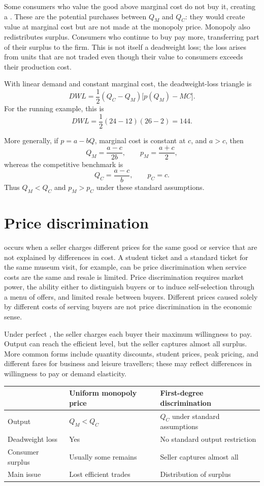 Some consumers who value the good above marginal cost do not buy it, creating
a . These are the potential purchases between
$Q_M$ and $Q_C$: they would create value at marginal cost but are not made at
the monopoly price. Monopoly also redistributes surplus. Consumers who
continue to buy pay more, transferring part of their surplus to the firm.
This  is not itself a deadweight loss; the loss
arises from units that are not traded even though their value to consumers
exceeds their production cost.

With linear demand and constant marginal cost, the deadweight-loss triangle is
\[
DWL=\frac{1}{2}(Q_C-Q_M)\bigl[p(Q_M)-MC\bigr].
\]
For the running example, this is
\[
DWL=\frac{1}{2}(24-12)(26-2)=144.
\]

More generally, if $p=a-bQ$, marginal cost is constant at $c$, and $a>c$, then
\[
Q_M=\frac{a-c}{2b},
\qquad
p_M=\frac{a+c}{2},
\]
whereas the competitive benchmark is
\[
Q_C=\frac{a-c}{b},
\qquad
p_C=c.
\]
Thus $Q_M<Q_C$ and $p_M>p_C$ under these standard assumptions.

\section{Price discrimination}

 occurs when a seller charges different prices
for the same good or service that are not explained by differences in cost. A
student ticket and a standard ticket for the same museum visit, for example,
can be price discrimination when service costs are the same and resale is
limited. Price discrimination requires market power, the ability either to
distinguish buyers or to induce self-selection through a menu of offers, and
limited resale between buyers. Different prices caused solely by different
costs of serving buyers are not price discrimination in the economic sense.

Under perfect , the seller charges
each buyer their maximum willingness to pay. Output can reach the efficient
level, but the seller captures almost all surplus. More common forms include
quantity discounts, student prices, peak pricing, and different fares for
business and leisure travellers; these may reflect differences in willingness
to pay or demand elasticity.

\begin{center}
\small
\begin{tabular}{p{}p{}p{}}
\toprule
 & Uniform monopoly price & First-degree discrimination \\
\midrule
Output & $Q_M<Q_C$ & $Q_C$ under standard assumptions \\
Deadweight loss & Yes & No standard output restriction \\
Consumer surplus & Usually some remains & Seller captures almost all \\
Main issue & Lost efficient trades & Distribution of surplus \\
\bottomrule
\end{tabular}
\end{center}

